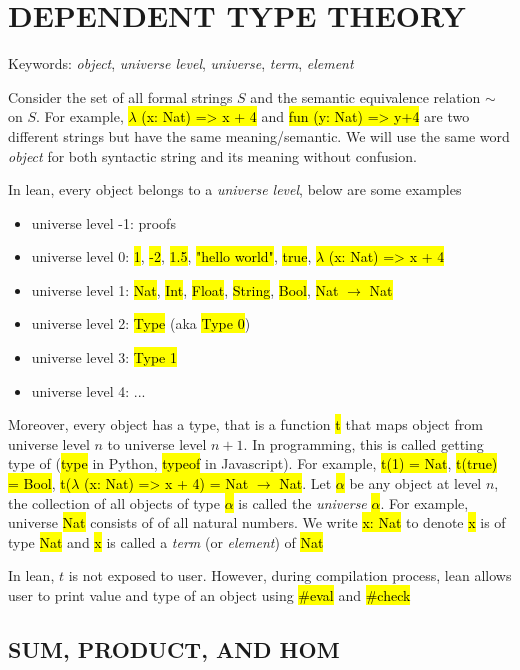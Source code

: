 \chapter{DEPENDENT TYPE THEORY}

Keywords: \textit{object}, \textit{universe level}, \textit{universe}, \textit{term}, \textit{element}

Consider the set of all formal strings $S$ and the semantic equivalence relation $\sim$ on $S$. For example, \hl{$\lambda$ (x: Nat) => x + 4} and \hl{fun (y: Nat) => y+4} are two different strings but have the same meaning/semantic. We will use the same word \textit{object} for both syntactic string and its meaning without confusion.

In lean, every object belongs to a \textit{universe level}, below are some examples

\begin{itemize}
	\item universe level -1: proofs
	\item universe level 0: \hl{1}, \hl{-2}, \hl{1.5}, \hl{"hello world"}, \hl{true}, \hl{$\lambda$ (x: Nat) => x + 4}
	\item universe level 1: \hl{Nat}, \hl{Int}, \hl{Float}, \hl{String}, \hl{Bool}, \hl{Nat $\to$ Nat}
	\item universe level 2: \hl{Type} (aka \hl{Type 0})
	\item universe level 3: \hl{Type 1}
	\item universe level 4: ...
\end{itemize}

Moreover, every object has a type, that is a function \hl{t} that maps object from universe level $n$ to universe level $n+1$. In programming, this is called getting type of (\hl{type} in Python, \hl{typeof} in Javascript). For example, \hl{t(1) = Nat}, \hl{t(true) = Bool}, \hl{t($\lambda$ (x: Nat) => x + 4) = Nat $\to$ Nat}. Let \hl{$\alpha$} be any object at level $n$, the collection of all objects of type \hl{$\alpha$} is called the \textit{universe} \hl{$\alpha$}. For example, universe \hl{Nat} consists of of all natural numbers. We write \hl{x: Nat} to denote \hl{x} is of type \hl{Nat} and \hl{x} is called a \textit{term} (or \textit{element}) of \hl{Nat}

In lean, $t$ is not exposed to user. However, during compilation process, lean allows user to print value and type of an object using \hl{\#eval} and \hl{\#check}

\section{SUM, PRODUCT, AND HOM}

